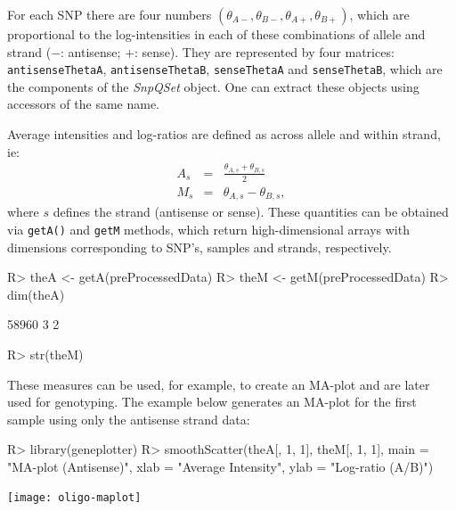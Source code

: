 \documentclass{article}
\newcommand{\Rmethod}[1]{{\texttt{#1}}}
\newcommand{\Robject}[1]{{\texttt{#1}}}
\newcommand{\Rclass}[1]{{\textit{#1}}}
\begin{document}
For each SNP there are four numbers $(\theta_{A-}, \theta_{B-},
\theta_{A+}, \theta_{B+})$, which are proportional to the
log-intensities in each of these combinations of allele and strand
($-$: antisense; $+$: sense). They are represented by four matrices:
\Robject{antisenseThetaA}, \Robject{antisenseThetaB},
\Robject{senseThetaA} and \Robject{senseThetaB}, which are the
components of the \Rclass{SnpQSet} object. One can extract these
objects using accessors of the same name.

Average intensities and log-ratios are defined as across allele and
within strand, ie:
\begin{eqnarray}
  A_{s} & = & \frac{\theta_{A, s}+\theta_{B, s}}{2} \\
  M_{s} & = & \theta_{A, s} - \theta_{B, s},
\end{eqnarray}
where $s$ defines the strand (antisense or sense). These quantities
can be obtained via \Rmethod{getA()} and \Rmethod{getM} methods, which
return high-dimensional arrays with dimensions corresponding to SNP's,
samples and strands, respectively.
\begin{Schunk}
\begin{Sinput}
R> theA <- getA(preProcessedData)
R> theM <- getM(preProcessedData)
R> dim(theA)
\end{Sinput}
\begin{Soutput}
[1] 58960     3     2
\end{Soutput}
\begin{Sinput}
R> str(theM)
\end{Sinput}
\end{Schunk}

These measures can be used, for example, to create an MA-plot and are
later used for genotyping. The example below generates an MA-plot for
the first sample using only the antisense strand data:
\begin{Schunk}
\begin{Sinput}
R> library(geneplotter)
R> smoothScatter(theA[, 1, 1], theM[, 1, 1], main = "MA-plot (Antisense)", 
     xlab = "Average Intensity", ylab = "Log-ratio (A/B)")
\end{Sinput}
\end{Schunk}
\texttt{[image: oligo-maplot]}
\end{document}
